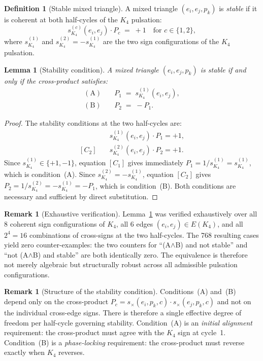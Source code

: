 \documentclass[11pt,a4paper]{article}
\newtheorem{lemma}[theorem]{Lemma}
\theoremstyle{definition}
\newtheorem{definition}[theorem]{Definition}
\newtheorem{remark}[theorem]{Remark}
\newcommand{\Kfour}{K_4}
\begin{document}
\begin{definition}[Stable mixed triangle]
\label{def:stable}
A mixed triangle $(e_i, e_j, p_k)$ is \emph{stable} if it is coherent at both half-cycles of the $\Kfour$ pulsation:
\[
s_{\Kfour}^{(c)}(e_i,e_j)\cdot P_c \;=\; +1 \quad \text{for } c \in \{1, 2\},
\]
where $s_{\Kfour}^{(1)}$ and $s_{\Kfour}^{(2)} = -s_{\Kfour}^{(1)}$ are the two sign configurations of the $\Kfour$ pulsation.
\end{definition}

\begin{lemma}[Stability condition]
\label{lem:L1}
A mixed triangle $(e_i, e_j, p_k)$ is stable if and only if the cross-product satisfies:
\begin{align}
\mathrm{(A)}&\quad P_1 \;=\; s_{\Kfour}^{(1)}(e_i,e_j), \label{eq:condA}\\
\mathrm{(B)}&\quad P_2 \;=\; -P_1. \label{eq:condB}
\end{align}
\end{lemma}

\begin{proof}
The stability conditions at the two half-cycles are:
\begin{align*}
[C_1]&\quad s_{\Kfour}^{(1)}(e_i,e_j)\cdot P_1 = +1,\\
[C_2]&\quad s_{\Kfour}^{(2)}(e_i,e_j)\cdot P_2 = +1.
\end{align*}
Since $s_{\Kfour}^{(1)} \in \{+1,-1\}$, equation $[C_1]$ gives immediately $P_1 = 1/s_{\Kfour}^{(1)} = s_{\Kfour}^{(1)}$, which is condition~(A). Since $s_{\Kfour}^{(2)} = -s_{\Kfour}^{(1)}$, equation $[C_2]$ gives $P_2 = 1/s_{\Kfour}^{(2)} = -s_{\Kfour}^{(1)} = -P_1$, which is condition~(B). Both conditions are necessary and sufficient by direct substitution.
\end{proof}

\begin{remark}[Exhaustive verification]
Lemma~\ref{lem:L1} was verified exhaustively over all 8 coherent sign configurations of $\Kfour$, all 6 edges $(e_i,e_j) \in E(\Kfour)$, and all $2^4 = 16$ combinations of cross-signs at the two half-cycles. The 768 resulting cases yield zero counter-examples: the two counters for ``(A$\wedge$B) and not stable'' and ``not (A$\wedge$B) and stable'' are both identically zero. The equivalence is therefore not merely algebraic but structurally robust across all admissible pulsation configurations.
\end{remark}

\begin{remark}[Structure of the stability condition]
Conditions~(A) and~(B) depend only on the cross-product $P_c = s_{\times}(e_i,p_k,c)\cdot s_{\times}(e_j,p_k,c)$ and not on the individual cross-edge signs. There is therefore a single effective degree of freedom per half-cycle governing stability. Condition~(A) is an \emph{initial alignment} requirement: the cross-product must agree with the $\Kfour$ sign at cycle~1. Condition~(B) is a \emph{phase-locking} requirement: the cross-product must reverse exactly when $\Kfour$ reverses.
\end{remark}
\end{document}
